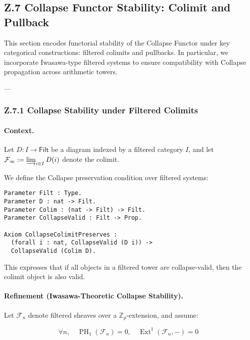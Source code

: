 \documentclass[11pt]{article}
\DeclareMathOperator{\Ext}{Ext}
\DeclareMathOperator{\PH}{PH}
\begin{document}
\subsection*{Z.7 Collapse Functor Stability: Colimit and Pullback}

This section encodes functorial stability of the Collapse Functor under key categorical constructions: filtered colimits and pullbacks.  
In particular, we incorporate Iwasawa-type filtered systems to ensure compatibility with Collapse propagation across arithmetic towers.

---

\subsubsection*{Z.7.1 Collapse Stability under Filtered Colimits}

\paragraph{Context.}
Let \( D : I \to \mathsf{Filt} \) be a diagram indexed by a filtered category \( I \), and let \( \mathcal{F}_\infty := \varinjlim_{i \in I} D(i) \) denote the colimit.

We define the Collapse preservation condition over filtered systems:

\begin{lstlisting}[language=Coq]
Parameter Filt : Type.
Parameter D : nat -> Filt.
Parameter Colim : (nat -> Filt) -> Filt.
Parameter CollapseValid : Filt -> Prop.

Axiom CollapseColimitPreserves :
  (forall i : nat, CollapseValid (D i)) ->
  CollapseValid (Colim D).
\end{lstlisting}

This expresses that if all objects in a filtered tower are collapse-valid, then the colimit object is also valid.

\paragraph{Refinement (Iwasawa-Theoretic Collapse Stability).}
Let \( \mathcal{F}_n \) denote filtered sheaves over a $\mathbb{Z}_p$-extension, and assume:

\[
\forall n, \quad \PH_1(\mathcal{F}_n) = 0,\quad \Ext^1(\mathcal{F}_n, -) = 0
\]
\end{document}
